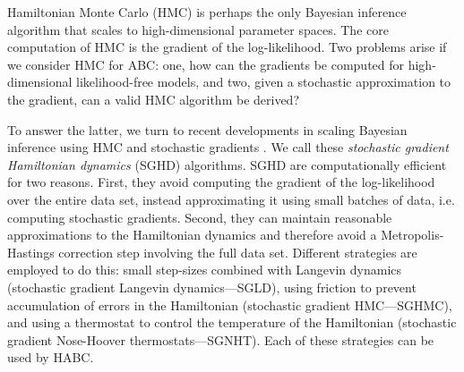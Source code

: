 \documentclass[]{article}
\begin{document}
Hamiltonian Monte Carlo (HMC) \cite{duane1987hybrid, neal2011mcmc} is perhaps the only Bayesian inference algorithm that scales to high-dimensional parameter spaces.  The core computation of HMC is the gradient of the log-likelihood.  Two problems arise if we consider HMC for ABC: one, how can the gradients be computed for high-dimensional likelihood-free models, and two, given a stochastic approximation to the gradient, can a valid HMC algorithm be derived?
 
 To answer the latter, we turn to recent developments in scaling Bayesian inference using HMC and stochastic gradients \cite{welling2011bayesian,chen2014stochastic,ding2014bayesian}.  We call these {\em stochastic gradient Hamiltonian dynamics} (SGHD) algorithms. SGHD are computationally efficient for two reasons.  First, they avoid computing the gradient of the log-likelihood over the entire data set, instead approximating it using small batches of data, i.e. computing stochastic gradients.  Second, they can maintain reasonable approximations to the Hamiltonian dynamics and therefore avoid a Metropolis-Hastings correction step involving the full data set.  Different strategies are employed to do this: small step-sizes combined with  Langevin dynamics \cite{welling2011bayesian} (stochastic gradient Langevin dynamics---SGLD), using friction to prevent accumulation of errors in the Hamiltonian \cite{chen2014stochastic} (stochastic gradient HMC---SGHMC), and using a thermostat to control the temperature of the Hamiltonian \cite{ding2014bayesian} (stochastic gradient Nose-Hoover thermostats---SGNHT).  Each of these strategies can be used by HABC.
 
\end{document}
